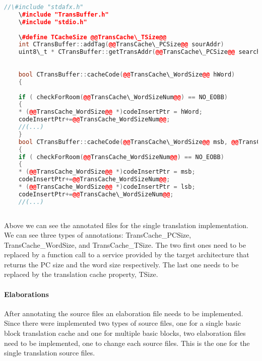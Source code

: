 	\begin{lstlisting}[caption=Annotations for single translation TransBuffer.cpp, label=lst:annotSingleTcache,language=C++]
	//\#include "stdafx.h"
	\#include "TransBuffer.h"
	\#include "stdio.h"
	
	\#define TCacheSize @@TransCache\_TSize@@
	int CTransBuffer::addTag(@@TransCache\_PCSize@@ sourAddr)
	uint8\_t * CTransBuffer::getTransAddr(@@TransCache\_PCSize@@ searchAddr)
	
	
	bool CTransBuffer::cacheCode(@@TransCache\_WordSize@@ hWord)
	{
	
	if ( checkForRoom(@@TransCache\_WordSizeNum@@) == NO_EOBB)
	{
	* (@@TransCache_WordSize@@ *)codeInsertPtr = hWord;
	codeInsertPtr+=@@TransCache_WordSizeNum@@;
	//(...)
	}
	bool CTransBuffer::cacheCode(@@TransCache\_WordSize@@ msb, @@TransCache_WordSize@@ lsb)
	{
	if ( checkForRoom(@@TransCache_WordSizeNum@@) == NO_EOBB)
	{
	* (@@TransCache_WordSize@@ *)codeInsertPtr = msb;
	codeInsertPtr+=@@TransCache_WordSizeNum@@;
	* (@@TransCache_WordSize@@ *)codeInsertPtr = lsb;
	codeInsertPtr+=@@TransCache\_WordSizeNum@@;
	//(...)
	
	\end{lstlisting}
	Above we can see the annotated files for the single translation implementation. We can see three types of annotations: TransCache\_PCSize, TransCache\_WordSize, and TransCache\_TSize. The two first ones need to be replaced by a function call to a service provided by the target architecture that returns the PC size and the word size respectively. The last one needs to be replaced by the translation cache property, TSize.
	
						
	\paragraph{Elaborations}
	After annotating the source files an elaboration file needs to be implemented. Since there were implemented two types of source files, one for a single basic block translation cache and one for multiple basic blocks, two elaboration files need to be implemented, one to change each source files. This is the one for the single translation source files.
	

